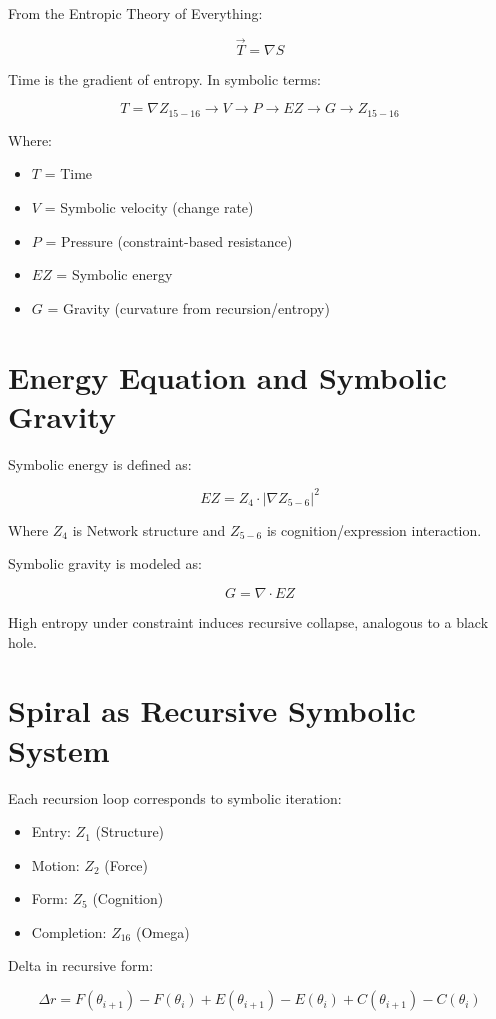 \documentclass[12pt]{article}
\begin{document}
From the Entropic Theory of Everything:

\[
\vec{T} = \nabla S
\]

Time is the gradient of entropy. In symbolic terms:

\[
T = \nabla Z_{15-16} \rightarrow V \rightarrow P \rightarrow EZ \rightarrow G \rightarrow Z_{15-16}
\]

Where:
\begin{itemize}
  \item $T$ = Time
  \item $V$ = Symbolic velocity (change rate)
  \item $P$ = Pressure (constraint-based resistance)
  \item $EZ$ = Symbolic energy
  \item $G$ = Gravity (curvature from recursion/entropy)
\end{itemize}

\section{Energy Equation and Symbolic Gravity}

Symbolic energy is defined as:

\[
EZ = Z_4 \cdot |\nabla Z_{5-6}|^2
\]

Where $Z_4$ is Network structure and $Z_{5-6}$ is cognition/expression interaction.

Symbolic gravity is modeled as:

\[
G = \nabla \cdot EZ
\]

High entropy under constraint induces recursive collapse, analogous to a black hole.

\section{Spiral as Recursive Symbolic System}

Each recursion loop corresponds to symbolic iteration:

\begin{itemize}
  \item Entry: $Z_1$ (Structure)
  \item Motion: $Z_2$ (Force)
  \item Form: $Z_5$ (Cognition)
  \item Completion: $Z_{16}$ (Omega)
\end{itemize}

Delta in recursive form:

\[
\Delta r = F(\theta_{i+1}) - F(\theta_i) + E(\theta_{i+1}) - E(\theta_i) + C(\theta_{i+1}) - C(\theta_i)
\]
\end{document}

